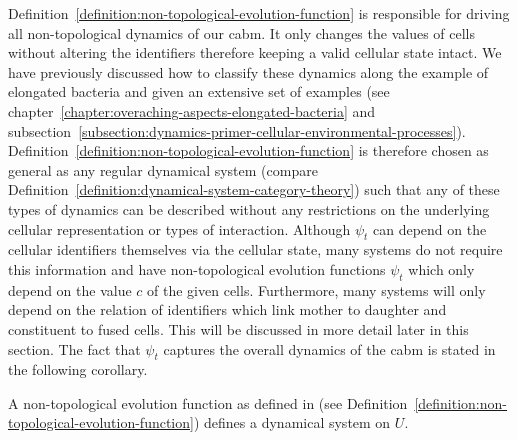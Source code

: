 Definition~\ref{definition:non-topological-evolution-function} is responsible for driving all
non-topological dynamics of our \ac{cabm}.
It only changes the values of cells without altering the identifiers therefore keeping a valid
cellular state intact.
We have previously discussed how to classify these dynamics along the example of elongated bacteria
and given an extensive set of examples
(see chapter~\ref{chapter:overaching-aspects-elongated-bacteria} and
subsection~\ref{subsection:dynamics-primer-cellular-environmental-processes}).
Definition~\ref{definition:non-topological-evolution-function} is therefore chosen as general as any
regular dynamical system (compare Definition~\ref{definition:dynamical-system-category-theory})
such that any of these types of dynamics can be described without any restrictions on the underlying
cellular representation or types of interaction.
Although $\psi_t$ can depend on the cellular identifiers themselves via the cellular state, many
systems do not require this information and have non-topological evolution functions $\psi_t$ which
only depend on the value $c$ of the given cells.
Furthermore, many systems will only depend on the relation of identifiers which link mother to
daughter and constituent to fused cells.
This will be discussed in more detail later in this section.
The fact that $\psi_t$ captures the overall dynamics of the \ac{cabm} is stated in the following
corollary.


\begin{corollary}
    A non-topological evolution function as defined in (see
    Definition~\ref{definition:non-topological-evolution-function}) defines a dynamical system on
    $U$.
\end{corollary}

